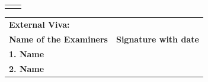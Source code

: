 \begin{center}
\renewcommand\tabularxcolumn[1]{>{\Centering}p{#1}}
\begin{tabularx}{\linewidth}{X X }
\textbf{}\linebreak\textbf{}\linebreak\textbf{}\linebreak &
\textbf{}\linebreak\textbf{}\linebreak\textbf{}\linebreak
\end{tabularx}
\renewcommand\tabularxcolumn[1]{}
\end{center}
\vfill
\begin{minipage}{14.8cm}
\begin{tabularx}{\linewidth}{X c}
\textbf{External Viva:}\\
\textbf{Name of the Examiners} & \textbf{Signature with date}\\
\textbf{1. Name}\\
\vfill
\textbf{2. Name}\\
\end{tabularx}
\end{minipage}

\pagebreak